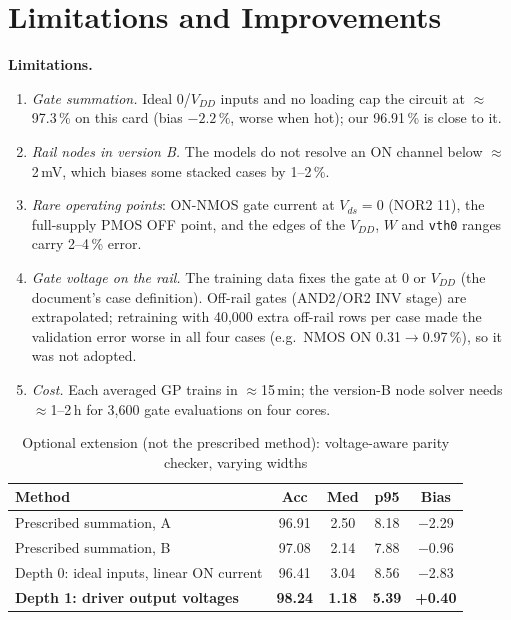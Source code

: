 ﻿\documentclass[conference,10pt]{IEEEtran}
\newcommand{\cc}[1]{\texttt{#1}}
\newcommand{\pct}{\,\%}
\begin{document}
\section{Limitations and Improvements}

\textbf{Limitations.}
\begin{enumerate}
\item \emph{Gate summation.} Ideal 0/$V_{DD}$ inputs and no loading cap the circuit at
$\approx$97.3\pct{} on this card (bias $-2.2\pct$, worse when hot); our 96.91\pct{} is close to it.
\item \emph{Rail nodes in version B.} The models do not resolve an ON channel below
$\approx$2\,mV, which biases some stacked cases by 1--2\pct.
\item \emph{Rare operating points}: ON-NMOS gate current at $V_{ds}=0$ (NOR2 11), the full-supply
PMOS OFF point, and the edges of the $V_{DD}$, $W$ and \cc{vth0} ranges carry 2--4\pct{} error.
\item \emph{Gate voltage on the rail.} The training data fixes the gate at 0 or $V_{DD}$ (the
document's case definition). Off-rail gates (AND2/OR2 INV stage) are extrapolated; retraining with
40,000 extra off-rail rows per case made the validation error worse in all four cases
(e.g.\ NMOS ON 0.31$\to$0.97\pct), so it was not adopted.
\item \emph{Cost.} Each averaged GP trains in $\approx$15\,min; the version-B node solver needs
$\approx$1--2\,h for 3,600 gate evaluations on four cores.
\end{enumerate}

\begin{table}[!t]
\caption{Optional extension (not the prescribed method): voltage-aware parity checker, varying widths}
\label{tab:vparity}
\centering
\footnotesize
\begin{tabular}{@{}lcccc@{}}
\toprule
Method & Acc & Med & p95 & Bias\\
\midrule
Prescribed summation, A & 96.91 & 2.50 & 8.18 & $-$2.29\\
Prescribed summation, B & 97.08 & 2.14 & 7.88 & $-$0.96\\
Depth 0: ideal inputs, linear ON current & 96.41 & 3.04 & 8.56 & $-$2.83\\
\textbf{Depth 1: driver output voltages} & \textbf{98.24} & \textbf{1.18} & \textbf{5.39} & \textbf{+0.40}\\
\bottomrule
\end{tabular}
\end{table}
\end{document}
